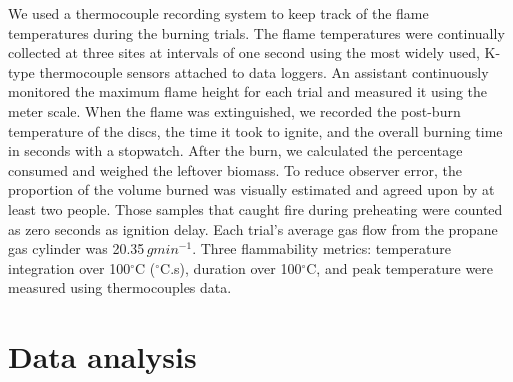 \documentclass{bmcart}
\begin{document}
We used a thermocouple recording system to keep track of the flame temperatures during the burning trials. The flame temperatures were continually collected at three sites at intervals of one second using the most widely used, K-type thermocouple sensors \citep{mcgranahan2020inconvenient} attached to data loggers. An assistant continuously monitored the maximum flame height for each trial and measured it using the meter scale. When the flame was extinguished, we recorded the post-burn temperature of the discs, the time it took to ignite, and the overall burning time in seconds with a stopwatch. After the burn, we calculated the percentage consumed and weighed the leftover biomass. To reduce observer error, the proportion of the volume burned was visually estimated and agreed upon by at least two people. Those samples that caught fire during preheating were counted as zero seconds as ignition delay. Each trial's average gas flow from the propane gas cylinder was 20.35\,$g min^{-1}$. Three flammability metrics: temperature integration over 100$^{\circ}$C ($^{\circ}$C.s), duration over 100$^{\circ}$C, and peak temperature were measured using thermocouples data.

\section*{Data analysis}
\end{document}
